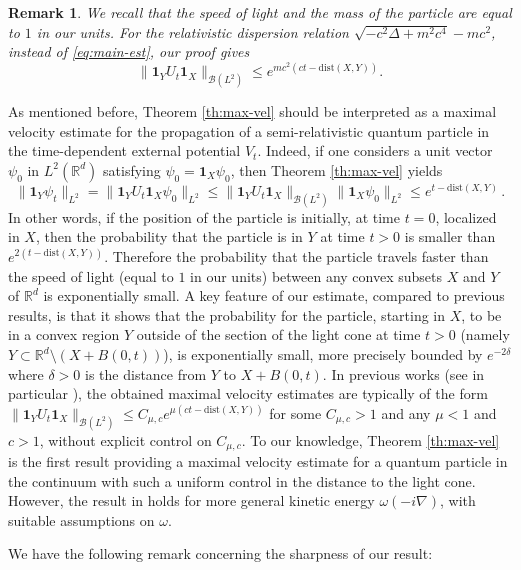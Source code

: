 \documentclass[12pt]{article}
\newcommand{\dXY}{{\mathrm{dist}(X,Y)}}
\theoremstyle{plain}
\newtheorem{rem}[theo]{Remark}
\begin{document}
\begin{rem}
We recall that the speed of light and the mass of the particle are equal to $1$ in our units. For the relativistic dispersion relation $\sqrt{-c^2\Delta+m^2c^4}-mc^2$, instead of \eqref{eq:main-est}, our proof gives
    \begin{equation*}
        \|\mathbf{1}_YU_t\mathbf{1}_X\|_{\mathcal{B}(L^2)}\le e^{mc^2(ct-\dXY)}.
    \end{equation*}
\end{rem}
As mentioned before, Theorem \ref{th:max-vel} should be interpreted as a maximal velocity estimate for the propagation of a semi-relativistic quantum particle in the time-dependent external potential $V_t$. Indeed, if one considers a unit vector~$\psi_0$ in $L^2(\mathbb{R}^d)$ satisfying $\psi_0 = \mathbf{1}_X \psi_0$, then Theorem \ref{th:max-vel} yields 
\[
\|\mathbf{1}_Y \psi_t \|_{L^2} = \|\mathbf{1}_Y U_t \mathbf{1}_X \psi_0 \|_{L^2} \leq \|\mathbf{1}_Y U_t \mathbf{1}_X\|_{\mathcal{B}(L^2)}\|\mathbf{1}_X \psi_0\|_{L^2}\leq e^{t-\dXY}\,.
\]
In other words, if the position of the particle is initially, at time $t=0$, localized in $X$, then the probability that the particle is in $Y$ at time $t>0$ is smaller than $e^{2(t-\dXY)}$. Therefore the probability that the particle travels faster than the speed of light (equal to $1$ in our units) between any convex subsets $X$ and $Y$ of $\mathbb{R}^d$ is exponentially small. A key feature of our estimate, compared to previous results, is that it shows that the probability for the particle, starting in $X$, to be in a convex region $Y$ outside of the section of the light cone at time $t>0$ (namely $Y\subset\mathbb{R}^d\setminus (X+B(0,t))$), is exponentially small, more precisely bounded by $e^{-2\delta}$ where $\delta>0$ is the distance from $Y$ to $X+B(0,t)$. In previous works (see in particular \cite{SigalWU}), the obtained maximal velocity estimates are typically of the form $\|\mathbf{1}_Y U_t \mathbf{1}_X\|_{\mathcal{B}(L^2)}\leq C_{\mu,c} e^{\mu(ct- \dXY)}$ for some $C_{\mu,c}>1$ and any $\mu<1$ and $c>1$, without explicit control on $C_{\mu,c}$. To our knowledge, Theorem \ref{th:max-vel} is the first result providing a maximal velocity estimate for a quantum particle in the continuum with such a uniform control in the distance to the light cone. However, the result in \cite{SigalWU} holds for more general kinetic energy $\omega(-i\nabla)$, with suitable assumptions on $\omega$.

We have the following remark concerning the sharpness of our result:
\end{document}
